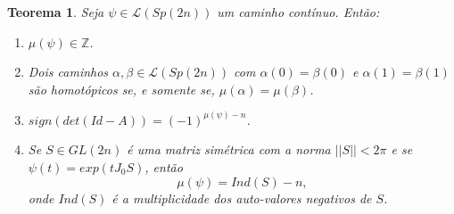 \documentclass[12pt]{book}
\newtheorem{teorema}{Teorema}[section]
\newcommand{\caminhos}{\mathcal{L}}
\newcommand{\caminhossempontobase}[1]{\caminhos(#1)}
\newcommand{\estruturacomplexa}{J_{0}}
\newcommand{\gruposimpletico}[1]{Sp(#1)}
\newcommand{\inteiros}{\mathbb{Z}}
\begin{document}
	\begin{teorema}
		Seja $\psi\in \caminhossempontobase{\gruposimpletico{2n}} $ um caminho contínuo. Então:
		\begin{enumerate}
			\item $\mu(\psi) \in \inteiros$.
			\item Dois caminhos $\alpha, \beta \in \caminhossempontobase{\gruposimpletico{2n}} $ com $\alpha(0) = \beta(0)$ e $\alpha(1) = \beta(1)$ são homotópicos se, e somente se, $\mu(\alpha) = \mu(\beta)$.
			\item $sign(det(Id - A)) = (-1)^{\mu(\psi)-n}$.
			\item Se $S \in GL(2n)$ é uma matriz simétrica com a norma $||S|| < 2\pi$ e se $\psi(t) = exp(t\estruturacomplexa S)$, então 
			$$
			\mu(\psi) = Ind(S) - n,
			$$
			onde $Ind(S)$ é a multiplicidade dos auto-valores negativos de $S$.
		\end{enumerate}
	\end{teorema}
\end{document}
